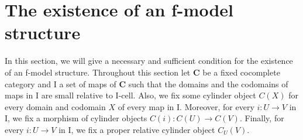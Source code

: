 \documentclass{amsart}
\theoremstyle{definition}
\newcommand{\cat}[1]{\mathbf{#1}}
\newcommand{\C}{\cat{C}}
\newcommand{\I}{\mathrm{I}}
\newcommand{\class}[2]{#1\text{-}\mathrm{#2}}
\newcommand{\Icell}[1][\I]{\class{#1}{cell}}
\newcommand{\cyli}{i}
\begin{document}
\begin{comment}
Now, we need to prove a technical lemma.
We will need this lemma later, so we define it in a general form which applies to every category.
\begin{lem}
Let $\C$ be a finitely cocomplete category and let $i : U \to V$ be a morphism of $\C$ with a system of cylinders for it.
If $f : X \to Y$ and $g : Y \to Z$ are morphisms of $\C$ such that $f$ has RLP up to $\sim$ with respect to $U$ and
$g \circ f$ has RLP up to $\sim_i$ with respect to $i$, then $f$ also has RLP up to $\sim_i$ with respect to $i$.
\end{lem}
\begin{proof}
Suppose that we have a commutative square as below.
Then there exists a map $u_x : U \to X$ and a homotopy $h : C(U) \to Y$ between $f \circ u_x$ and $u$.
\[ \xymatrix{   \ar@{}[dr]|(.7){\sim}                 & X \ar[d]^f \\
              U \ar@{-->}[ur]^{u_x} \ar[d]_i \ar[r]_u & Y \ar[d]^g \\
              V \ar[r]_v                              & Z
            } \]
The map $g \circ h$ is a homotopy between $g \circ f \circ u_x$ and $v \circ i$.
By the homotopy extension property, we have a map $v_z : V \to Z$ and a homotopy $h_z : C(V) \to Z$ between $v_z$ and $v$.
Consider the following diagram:
\[ \xymatrix{ U \ar[r]^{u_x} \ar[d]_i \ar@{}[dr]|(.7){\sim_i} & X \ar[d]^{g \circ f} \\
              V \ar[r]_{v_z} \ar@{-->}[ur]^{v_x}              & Z.
            } \]
By assumption on $g \circ f$, we have a lift $v_x : V \to X$ together
with a homotopy $h_1 : C_U(V) \to Z$ between $g \circ f \circ v_x$ and $v_z$.

Note that $h \circ \cyli_0 = f \circ v_x \circ i$.
By the homotopy extension property, we have a map $v_y : V \to Y$ and a homotopy $h_y : C(V) \to Y$ between $f \circ v_x$ and $v_y$.
Now, we have map $[h_z, g \circ h_y, h_1] : C(V) \amalg_{C(U)} C(V) \amalg_{V \amalg_U V} C_U(V) \to Z$.
By condition~\eqref{it:comp}, we have a map $h_2 : C_U(V) \to Z$ which gives us a homotopy between $g \circ v_y$ and $v$.
Thus $v_y$ is a required lift.
\end{proof}
\end{comment}

\section{The existence of an f-model structure}

In this section, we will give a necessary and sufficient
condition for the existence of an f-model structure.
Throughout this section let $\C$ be a fixed cocomplete category and $\I$ a set of maps of $\C$
such that the domains and the codomains of maps in $\I$ are small relative to $\Icell$.
Also, we fix some cylinder object $C(X)$ for every domain and codomain $X$ of every map in $\I$.
Moreover, for every $i : U \to V$ in $\I$, we fix a morphism of cylinder objects $C(i) : C(U) \to C(V)$.
Finally, for every $i : U \to V$ in $\I$, we fix a proper relative cylinder object $C_U(V)$.
\end{document}
